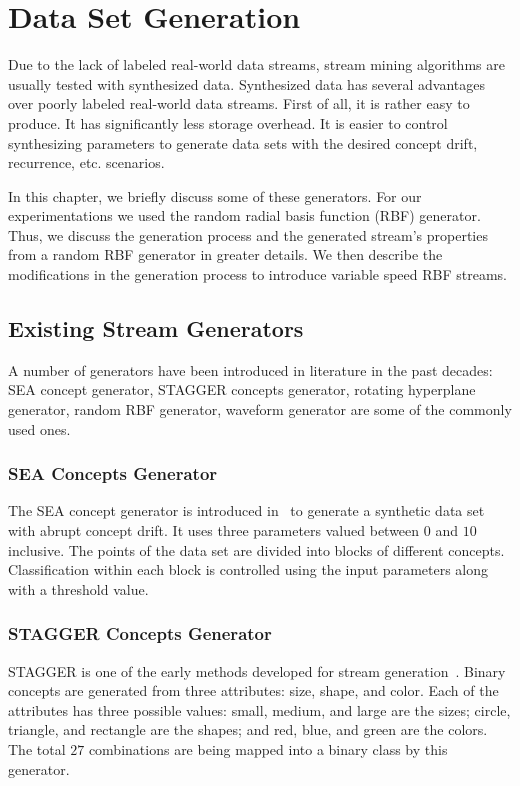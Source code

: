 \chapter{Data Set Generation}
\label{chp:dataset}
Due to the lack of labeled real-world data streams, stream mining algorithms are usually tested with synthesized data. Synthesized data has several advantages over poorly labeled real-world data streams. First of all, it is rather easy to produce. It has significantly less storage overhead. It is easier to control synthesizing parameters to generate data sets with the desired concept drift, recurrence, etc. scenarios.

In this chapter, we briefly discuss some of these generators. For our experimentations we used the random radial basis function (RBF) generator. Thus, we  discuss the generation process and the generated stream's properties from a random RBF generator in greater details. We then describe the modifications in the generation process to introduce variable speed RBF streams.

\section{Existing Stream Generators}
A number of generators have been introduced in literature in the past decades: SEA concept generator, STAGGER concepts generator, rotating hyperplane generator, random RBF generator, waveform generator are some of the commonly used ones. 

\subsection*{SEA Concepts Generator}
The SEA concept generator is introduced in~\cite{street01:sea} to generate a synthetic data set with abrupt concept drift. It uses three parameters valued between $0$ and $10$ inclusive. The points of the data set are divided into blocks of different concepts. Classification within each block is controlled using the input parameters along with a threshold value.

\subsection*{STAGGER Concepts Generator}
STAGGER is one of the early methods developed for stream generation~\cite{schlimmer86:stagger}. Binary concepts are generated from three attributes: size, shape, and color. Each of the attributes has three possible values: small, medium, and large are the sizes; circle, triangle, and rectangle are the shapes; and red, blue, and green are the colors. The total $27$ combinations are being mapped into a binary class by this generator.

